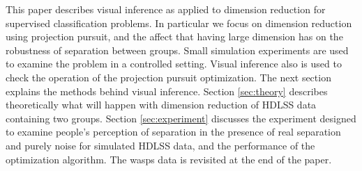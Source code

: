 \documentclass[12]{article}
\begin{document}
This paper describes visual inference as applied to dimension reduction for supervised classification problems. In particular we focus on dimension reduction using projection pursuit, and the affect that having large dimension has on the robustness of separation between groups.  Small simulation experiments are used to examine the problem in a controlled setting. Visual inference also is used to check the operation of the projection pursuit optimization. The next section explains the methods behind visual inference. Section \ref{sec:theory} describes theoretically what will happen with dimension reduction of HDLSS data containing two groups. Section \ref{sec:experiment} discusses the experiment designed to examine people's perception of separation in the presence of real separation and purely noise for simulated HDLSS data, and the performance of the optimization algorithm. The wasps data is revisited at the end of the paper. 
\end{document}
